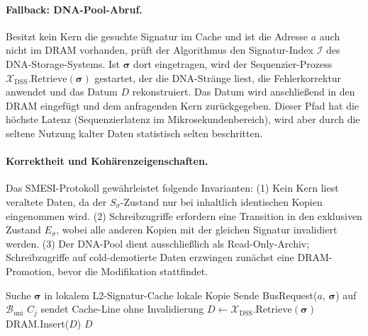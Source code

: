 ﻿\documentclass[a4paper,12pt]{article}
\theoremstyle{definition}
\begin{document}
\paragraph{Fallback: DNA-Pool-Abruf.}
Besitzt kein Kern die gesuchte Signatur im Cache und ist die Adresse $a$ auch nicht im DRAM vorhanden, prüft der Algorithmus den Signatur-Index $\mathcal{I}$ des DNA-Storage-Systems. Ist $\boldsymbol{\sigma}$ dort eingetragen, wird der Sequenzier-Prozess $\mathcal{X}_{\mathrm{DSS}}.\mathrm{Retrieve}(\boldsymbol{\sigma})$ gestartet, der die DNA-Stränge liest, die Fehlerkorrektur anwendet und das Datum $D$ rekonstruiert. Das Datum wird anschließend in den DRAM eingefügt und dem anfragenden Kern zurückgegeben. Dieser Pfad hat die höchste Latenz (Sequenzierlatenz im Mikrosekundenbereich), wird aber durch die seltene Nutzung kalter Daten statistisch selten beschritten.

\paragraph{Korrektheit und Kohärenzeigenschaften.}
Das SMESI-Protokoll gewährleistet folgende Invarianten: (1) Kein Kern liest veraltete Daten, da der $S_\sigma$-Zustand nur bei inhaltlich identischen Kopien eingenommen wird. (2) Schreibzugriffe erfordern eine Transition in den exklusiven Zustand $E_\sigma$, wobei alle anderen Kopien mit der gleichen Signatur invalidiert werden. (3) Der DNA-Pool dient ausschließlich als Read-Only-Archiv; Schreibzugriffe auf cold-demotierte Daten erzwingen zunächst eine DRAM-Promotion, bevor die Modifikation stattfindet.

\begin{algorithm}[H]
  \caption{SMESI-Protokoll: Kohärenz-Lookup via Signatur}
  \label{alg:smesi_lookup}
  \begin{algorithmic}[1]
    \State Suche $\boldsymbol{\sigma}$ in lokalem L2-Signatur-Cache
        \State \Return lokale Kopie 
      \EndIf
    \EndIf
    \State Sende BusRequest($a$, $\boldsymbol{\sigma}$) auf $\mathcal{B}_{\mathrm{uni}}$
      \State $C_j$ sendet Cache-Line ohne Invalidierung 
    \EndFor
       
        \State $D \gets \mathcal{X}_{\mathrm{DSS}}.\mathrm{Retrieve}(\boldsymbol{\sigma})$
        \State DRAM.Insert($D$)
        \State \Return $D$
      \EndIf
    \EndIf
  \end{algorithmic}
\end{algorithm}
\end{document}
